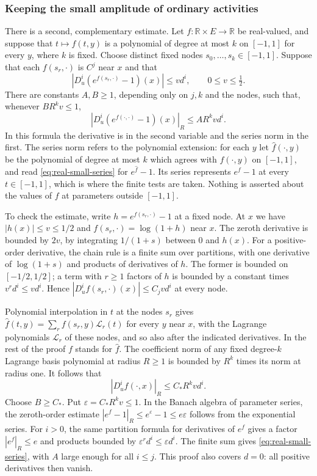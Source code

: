 \subsubsection{Keeping the small amplitude of ordinary activities}
There is a second, complementary estimate. Let
$f:\mathbb R\times E\to\mathbb R$ be real-valued, and suppose that
$t\mapsto f(t,y)$ is a polynomial of degree at most $k$ on
$[-1,1]$ for every $y$, where $k$ is fixed. Choose distinct fixed
nodes $s_0,\ldots,s_k\in[-1,1]$. Suppose that each $f(s_r,\cdot)$
is $C^j$ near $x$ and that
\begin{equation}\label{eq:real-small-activity}
 |D_u^i(e^{f(s_r,\cdot)}-1)(x)|\le v d^i,
                  \qquad 0\le v\le\tfrac12.
\end{equation}
There are constants $A,B\ge1$, depending only on $j,k$ and the
nodes, such that, whenever $BR^kv\le1$,
\begin{equation}\label{eq:real-small-series}
        |D_u^i(e^{f(\cdot,\cdot)}-1)(x)|_R
                                      \le AR^k v d^i.
\end{equation}
In this formula the derivative is in the second variable and the
series norm in the first. The series norm refers to the polynomial
extension: for each $y$ let $\widehat f(\cdot,y)$ be the polynomial of
degree at most $k$ which agrees with $f(\cdot,y)$ on $[-1,1]$, and
read \eqref{eq:real-small-series} for $e^{\widehat f}-1$. Its series
represents $e^{f}-1$ at every $t\in[-1,1]$, which is where the
finite tests are taken. Nothing is asserted about the values of $f$
at parameters outside $[-1,1]$.

To check the estimate, write $h=e^{f(s_r,\cdot)}-1$ at a fixed
node. At $x$ we have $|h(x)|\le v\le1/2$ and
$f(s_r,\cdot)=\log(1+h)$ near $x$. The zeroth derivative is
bounded by $2v$, by integrating $1/(1+s)$ between $0$ and $h(x)$.
For a positive-order derivative, the chain rule is a finite sum
over partitions, with one derivative of $\log(1+s)$ and products
of derivatives of $h$. The former is bounded on $[-1/2,1/2]$;
a term with $r\ge1$ factors of $h$ is bounded by a constant
times $v^r d^i\le v d^i$. Hence
$|D_u^if(s_r,\cdot)(x)|\le C_jv d^i$ at every node.

Polynomial interpolation in $t$ at the nodes $s_r$ gives
$\widehat f(t,y)=\sum_rf(s_r,y)\mathcal L_r(t)$ for every $y$ near
$x$, with the Lagrange polynomials $\mathcal L_r$ of these nodes, and
so also after the indicated derivatives. In the rest of the proof
$f$ stands for $\widehat f$. The coefficient norm of
any fixed degree-$k$ Lagrange basis polynomial at radius $R\ge1$
is bounded by $R^k$ times its norm at radius one. It follows that
\[
                  |D_u^if(\cdot,x)|_R\le C_*R^k v d^i.
\]
Choose $B\ge C_*$. Put $\varepsilon=C_*R^kv\le1$. In the
Banach algebra of parameter series, the zeroth-order estimate
$|e^f-1|_R\le e^\varepsilon-1\le e\varepsilon$ follows from
the exponential series. For $i>0$, the same partition formula
for derivatives of $e^f$ gives a factor $|e^f|_R\le e$ and
products bounded by $\varepsilon^r d^i\le\varepsilon d^i$.
The finite sum gives \eqref{eq:real-small-series}, with $A$
large enough for all $i\le j$. This proof also covers $d=0$:
all positive derivatives then vanish.

